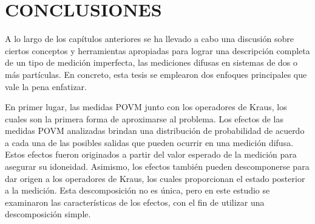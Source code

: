 \chapter{CONCLUSIONES}


A lo largo de los capítulos anteriores se ha llevado a cabo una discusión sobre
ciertos conceptos y herramientas apropiadas para lograr una descripción
completa de un tipo de medición imperfecta, las mediciones difusas en sistemas
de dos o más partículas. En concreto, esta tesis se emplearon dos enfoques
principales que vale la pena enfatizar.





En primer lugar, las medidas POVM junto con los operadores de Kraus, los cuales
son la primera forma de aproximarse al problema. Los efectos de las medidas
POVM  analizadas brindan una distribución de probabilidad de acuerdo a cada una
de las posibles salidas que pueden ocurrir en una medición difusa. Estos
efectos fueron originados a partir del valor esperado de la medición para
asegurar su idoneidad.  Asimismo, los efectos también pueden descomponerse
para dar origen a los operadores de Kraus, los cuales proporcionan el estado
posterior a la medición. Esta descomposición no es única, pero en este estudio
se examinaron las características de los efectos, con el fin de utilizar una
descomposición simple.


